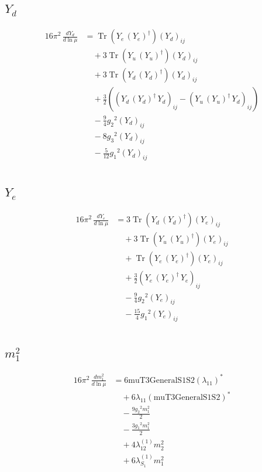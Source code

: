 \documentclass[10pt,a4paper]{article}
\begin{document}
\subsection*{$Y_d$}
\begin{align*}
16\pi^2\,\frac{d Y_d}{d\ln\mu} &=\operatorname{Tr}\!\left({Y_e}\,\left({Y_e}\right)^{\dagger}\right) \left({Y_d}\right)_{ij} \\
&\quad +3 \operatorname{Tr}\!\left({Y_u}\,\left({Y_u}\right)^{\dagger}\right) \left({Y_d}\right)_{ij} \\
&\quad +3 \operatorname{Tr}\!\left({Y_d}\,\left({Y_d}\right)^{\dagger}\right) \left({Y_d}\right)_{ij} \\
&\quad +\frac{3}{2} (\left({Y_d}\,\left({Y_d}\right)^{\dagger}\,{Y_d}\right)_{ij}-\left({Y_u}\,\left({Y_u}\right)^{\dagger}\,{Y_d}\right)_{ij}) \\
&\quad -\frac{9}{4} {g_2}^2 \left({Y_d}\right)_{ij} \\
&\quad -8 {g_3}^2 \left({Y_d}\right)_{ij} \\
&\quad -\frac{5}{12} {g_1}^2 \left({Y_d}\right)_{ij} \\
\end{align*}
\subsection*{$Y_e$}
\begin{align*}
16\pi^2\,\frac{d Y_e}{d\ln\mu} &=3 \operatorname{Tr}\!\left({Y_d}\,\left({Y_d}\right)^{\dagger}\right) \left({Y_e}\right)_{ij} \\
&\quad +3 \operatorname{Tr}\!\left({Y_u}\,\left({Y_u}\right)^{\dagger}\right) \left({Y_e}\right)_{ij} \\
&\quad +\operatorname{Tr}\!\left({Y_e}\,\left({Y_e}\right)^{\dagger}\right) \left({Y_e}\right)_{ij} \\
&\quad +\frac{3}{2} \left({Y_e}\,\left({Y_e}\right)^{\dagger}\,{Y_e}\right)_{ij} \\
&\quad -\frac{9}{4} {g_2}^2 \left({Y_e}\right)_{ij} \\
&\quad -\frac{15}{4} {g_1}^2 \left({Y_e}\right)_{ij} \\
\end{align*}
\subsection*{$m_1^2$}
\begin{align*}
16\pi^2\,\frac{d m_1^2}{d\ln\mu} &=6 \text{muT3GeneralS1S2} \left({\lambda_{11}}\right)^{*} \\
&\quad +6 {\lambda_{11}} \left(\text{muT3GeneralS1S2}\right)^{*} \\
&\quad -\frac{9 {g_2}^2 {m_1^2}}{2} \\
&\quad -\frac{3 {g_1}^2 {m_1^2}}{2} \\
&\quad +4 {\lambda_{12}^{(1)}} {m_2^2} \\
&\quad +6 {\lambda_{S_1}^{(1)}} {m_1^2} \\
\end{align*}
\end{document}
